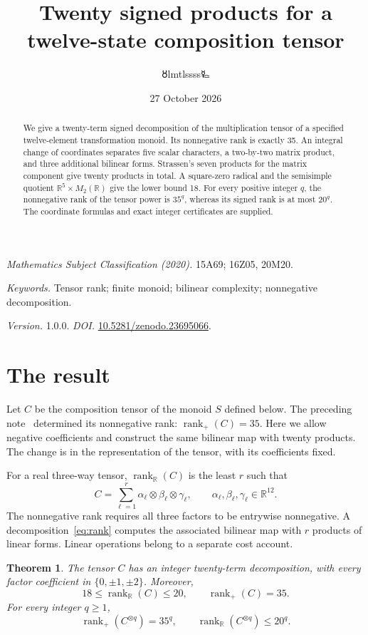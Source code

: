 \documentclass[11pt,a4paper]{article}
\title{\LARGE Twenty signed products for a\protect\\twelve-state composition tensor}
\author{{\authorsymbol 🜘}lmtlssss{\authorsymbol 🜐}}
\date{27 October 2026}
\newtheorem{theorem}{Theorem}
\newcommand{\R}{\mathbb R}\newcommand{\Q}{\mathbb Q}
\newcommand{\rkplus}{\operatorname{rank}_{+}}
\newcommand{\rkreal}{\operatorname{rank}_{\R}}
\begin{document}
\maketitle\thispagestyle{plain}
\begin{abstract}
We give a twenty-term signed decomposition of the multiplication tensor of a
specified twelve-element transformation monoid. Its nonnegative rank is
exactly 35. An integral change of coordinates separates five scalar
characters, a two-by-two matrix product, and three additional bilinear
forms. Strassen's seven products for the matrix component give twenty
products in total. A square-zero radical and the semisimple quotient
$\R^5\times M_2(\R)$ give the lower bound 18. For every positive integer
$q$, the nonnegative rank of the tensor power is $35^q$, whereas its
signed rank is at most $20^q$. The coordinate formulas and exact
integer certificates are supplied.
\end{abstract}
\noindent\textit{Mathematics Subject Classification (2020).}
15A69; 16Z05, 20M20.\par
\noindent\textit{Keywords.} Tensor rank; finite monoid; bilinear complexity;
nonnegative decomposition.\par
\noindent\textit{Version.} 1.0.0.\quad
\textit{DOI.} \href{https://doi.org/10.5281/zenodo.23695066}{10.5281/zenodo.23695066}.

\section{The result}

Let $C$ be the composition tensor of the monoid $S$ defined below.
The preceding note~\cite{positive} determined its nonnegative rank:
$\rkplus(C)=35$. Here we allow negative coefficients and construct the
same bilinear map with twenty products. The change is in the
representation of the tensor, with its coefficients fixed.

For a real three-way tensor, $\rkreal(C)$ is the least $r$ such that
\begin{equation}\label{eq:rank}
 C=\sum_{\ell=1}^{r}\alpha_\ell\otimes\beta_\ell\otimes\gamma_\ell,
 \qquad \alpha_\ell,\beta_\ell,\gamma_\ell\in\R^{12}.
\end{equation}
The nonnegative rank requires all three factors to be entrywise
nonnegative. A decomposition~\eqref{eq:rank} computes the associated
bilinear map with $r$ products of linear forms. Linear operations belong
to a separate cost account.

\begin{theorem}\label{thm:main}
The tensor $C$ has an integer twenty-term decomposition, with every
factor coefficient in $\{0,\pm1,\pm2\}$. Moreover,
\begin{equation}\label{eq:bounds}
 18\leq\rkreal(C)\leq20,\qquad \rkplus(C)=35.
\end{equation}
For every integer $q\geq1$,
\begin{equation}\label{eq:power}
 \rkplus(C^{\otimes q})=35^q,
 \qquad \rkreal(C^{\otimes q})\leq20^q.
\end{equation}
\end{theorem}
\end{document}
